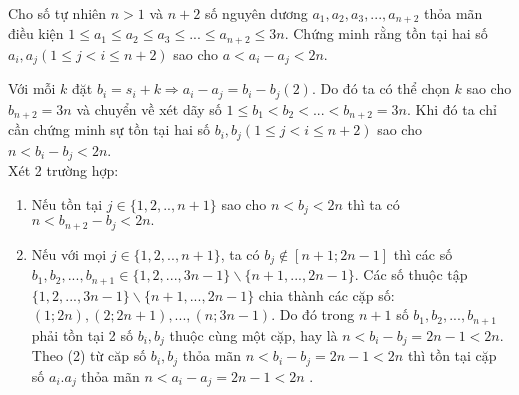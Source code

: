 \begin{ex}%
	Cho số tự nhiên $n>1$ và $n+2$ số nguyên dương $a_1,a_2,a_3,...,a_{n+2}$ thỏa mãn điều kiện $1\leq a_1\leq a_2\leq a_3\leq ...\leq a_{n+2}\leq 3n$. Chứng minh rằng tồn tại hai số $a_i,a_j(1\leq j<i\leq n+2) $ sao cho $a<a_i-a_j<2n$.
	\loigiai
	{Với mỗi $k$ đặt $b_i=s_i+k\Rightarrow a_i-a_j=b_i-b_j (2) $. Do đó ta có thể chọn $k$ sao cho $b_{n+2}=3n$ và chuyển về xét dãy số $1\leq b_1< b_2<...<b_{n+2}=3n.$ Khi đó ta chỉ cần chứng minh sự tồn tại hai số $b_i,b_j(1\leq j<i\leq n+2) $ sao cho $n<b_{i}-b_j<2n$.\\
		Xét 2 trường hợp:
		\begin{enumerate}
			\item Nếu tồn tại $j\in\{1,2,..,n+1\} $ sao cho $n<b_j<2n$ thì ta có $n<b_{n+2}-b_j<2n.$
			\item Nếu với mọi $j\in\{1,2,..,n+1\} $, ta có $ b_j\notin [n+1;2n-1] $ thì các số $b_1,b_2,...,b_{n+1}\in \{1,2,...,3n-1\}\backslash \{n+1,...,2n-1\}$. Các số thuộc tập $\{1,2,...,3n-1\}\backslash \{n+1,...,2n-1\}$ chia thành các cặp số: $(1;2n),(2;2n+1),...,(n;3n-1)$. Do đó trong $n+1$ số $b_1,b_2,...,b_{n+1}$ phải tồn tại 2 số $b_i,b_j$ thuộc cùng một cặp, hay là $n<b_i-b_j=2n-1<2n$. Theo (2) từ căp số $b_i,b_j$ thỏa mãn $n<b_i-b_j=2n-1<2n$ thì tồn tại cặp số $a_i.a_j$ thỏa mãn $n<a_i-a_j=2n-1<2n$ .
				\end{enumerate}
			}
\end{ex}


